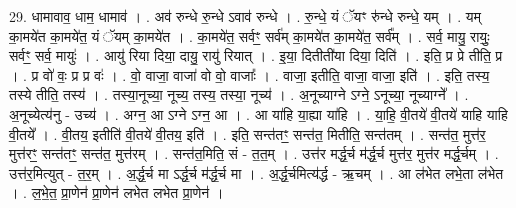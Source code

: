 \documentclass[17pt]{extarticle}
\begin{document}
29. धामावाव॒ धाम॒ धामाव॑ । . अव॑ रुन्धे रु॒न्धे ऽवाव॑ रुन्धे । . रु॒न्धे॒ यं ॅयꣳ रु॑न्धे रुन्धे॒ यम् । . यम् का॒मये॑त का॒मये॑त॒ यं ॅयम् का॒मये॑त । . का॒मये॑त॒ सर्वꣳ॒॒ सर्व॑म् का॒मये॑त का॒मये॑त॒ सर्व᳚म् । . सर्व॒ मायु॒ रायुः॒ सर्वꣳ॒॒ सर्व॒ मायुः॑ । . आयु॑ रिया दिया॒ दायु॒ रायु॑ रियात् । . इ॒या॒ दितीती॑या दिया॒ दिति॑ । . इति॒ प्र प्रे तीति॒ प्र । . प्र वो॑ वः॒ प्र प्र वः॑ । . वो॒ वाजा॒ वाजा॑ वो वो॒ वाजाः᳚ । . वाजा॒ इतीति॒ वाजा॒ वाजा॒ इति॑ । . इति॒ तस्य॒ तस्ये तीति॒ तस्य॑ । . तस्या॒नूच्या॒ नूच्य॒ तस्य॒ तस्या॒ नूच्य॑ । . अ॒नूच्याग्ने ऽग्ने॒ ऽनूच्या॒ नूच्याग्ने᳚ । . अ॒नूच्येत्य॑नु - उच्य॑ । . अग्न॒ आ ऽग्ने ऽग्न॒ आ । . आ या॑हि या॒ह्या या॑हि । . या॒हि॒ वी॒तये॑ वी॒तये॑ याहि याहि वी॒तये᳚ । . वी॒तय॒ इतीति॑ वी॒तये॑ वी॒तय॒ इति॑ । . इति॒ सन्त॑तꣳ॒॒ सन्त॑त॒ मितीति॒ सन्त॑तम् । . सन्त॑त॒ मुत्त॑र॒ मुत्त॑रꣳ॒॒ सन्त॑तꣳ॒॒ सन्त॑त॒ मुत्त॑रम् । . सन्त॑त॒मिति॒ सं - त॒त॒म् । . उत्त॑र मर्द्ध॒र्च म॑र्द्ध॒र्च मुत्त॑र॒ मुत्त॑र मर्द्ध॒र्चम् । . उत्त॑र॒मित्युत् - त॒र॒म् । . अ॒र्द्ध॒र्च मा ऽर्द्ध॒र्च म॑र्द्ध॒र्च मा । . अ॒र्द्ध॒र्चमित्य॑र्द्ध - ऋ॒चम् । . आ ल॑भेत लभे॒ता ल॑भेत । . ल॒भे॒त॒ प्रा॒णेन॑ प्रा॒णेन॑ लभेत लभेत प्रा॒णेन॑ । \newline
\end{document}
